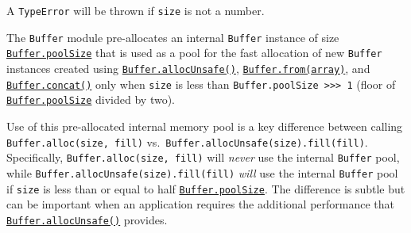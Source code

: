 \begin{Shaded}
\begin{Highlighting}[]
\NormalTok{ \{ }\NormalTok{ \} }\OperatorTok{=} \NormalTok{(}\NormalTok{)}\OperatorTok{;}

\OperatorTok{=} \NormalTok{(}\NormalTok{)}\OperatorTok{;}

\OperatorTok{;}

\NormalTok{(}\NormalTok{)}\OperatorTok{;}

\OperatorTok{;}
\end{Highlighting}
\end{Shaded}

A \texttt{TypeError} will be thrown if \texttt{size} is not a number.

The \texttt{Buffer} module pre-allocates an internal \texttt{Buffer}
instance of size
\hyperref[class-property-bufferpoolsize]{\texttt{Buffer.poolSize}} that
is used as a pool for the fast allocation of new \texttt{Buffer}
instances created using
\hyperref[static-method-bufferallocunsafesize]{\texttt{Buffer.allocUnsafe()}},
\hyperref[static-method-bufferfromarray]{\texttt{Buffer.from(array)}},
and
\hyperref[static-method-bufferconcatlist-totallength]{\texttt{Buffer.concat()}}
only when \texttt{size} is less than
\texttt{Buffer.poolSize\ \textgreater{}\textgreater{}\textgreater{}\ 1}
(floor of
\hyperref[class-property-bufferpoolsize]{\texttt{Buffer.poolSize}}
divided by two).

Use of this pre-allocated internal memory pool is a key difference
between calling \texttt{Buffer.alloc(size,\ fill)}
vs.~\texttt{Buffer.allocUnsafe(size).fill(fill)}. Specifically,
\texttt{Buffer.alloc(size,\ fill)} will \emph{never} use the internal
\texttt{Buffer} pool, while \texttt{Buffer.allocUnsafe(size).fill(fill)}
\emph{will} use the internal \texttt{Buffer} pool if \texttt{size} is
less than or equal to half
\hyperref[class-property-bufferpoolsize]{\texttt{Buffer.poolSize}}. The
difference is subtle but can be important when an application requires
the additional performance that
\hyperref[static-method-bufferallocunsafesize]{\texttt{Buffer.allocUnsafe()}}
provides.


